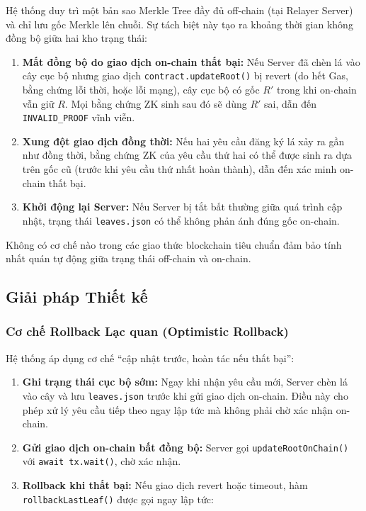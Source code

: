 \documentclass[../DoAn.tex]{subfiles}
\begin{document}
Hệ thống duy trì một bản sao Merkle Tree đầy đủ off-chain (tại Relayer Server) và chỉ lưu gốc Merkle lên chuỗi. Sự tách biệt này tạo ra khoảng thời gian không đồng bộ giữa hai kho trạng thái:

\begin{enumerate}
    \item \textbf{Mất đồng bộ do giao dịch on-chain thất bại:} Nếu Server đã chèn lá vào cây cục bộ nhưng giao dịch \texttt{contract.updateRoot()} bị revert (do hết Gas, bằng chứng lỗi thời, hoặc lỗi mạng), cây cục bộ có gốc $R'$ trong khi on-chain vẫn giữ $R$. Mọi bằng chứng ZK sinh sau đó sẽ dùng $R'$ sai, dẫn đến \texttt{INVALID\_PROOF} vĩnh viễn.

    \item \textbf{Xung đột giao dịch đồng thời:} Nếu hai yêu cầu đăng ký lá xảy ra gần như đồng thời, bằng chứng ZK của yêu cầu thứ hai có thể được sinh ra dựa trên gốc cũ (trước khi yêu cầu thứ nhất hoàn thành), dẫn đến xác minh on-chain thất bại.

    \item \textbf{Khởi động lại Server:} Nếu Server bị tắt bất thường giữa quá trình cập nhật, trạng thái \texttt{leaves.json} có thể không phản ánh đúng gốc on-chain.
\end{enumerate}

Không có cơ chế nào trong các giao thức blockchain tiêu chuẩn đảm bảo tính nhất quán tự động giữa trạng thái off-chain và on-chain.

\subsection{Giải pháp Thiết kế}
\label{subsec:sync_solution}

\subsubsection{Cơ chế Rollback Lạc quan (Optimistic Rollback)}

Hệ thống áp dụng cơ chế ``cập nhật trước, hoàn tác nếu thất bại'':

\begin{enumerate}
    \item \textbf{Ghi trạng thái cục bộ sớm:} Ngay khi nhận yêu cầu mới, Server chèn lá vào cây và lưu \texttt{leaves.json} trước khi gửi giao dịch on-chain. Điều này cho phép xử lý yêu cầu tiếp theo ngay lập tức mà không phải chờ xác nhận on-chain.

    \item \textbf{Gửi giao dịch on-chain bất đồng bộ:} Server gọi \texttt{updateRootOnChain()} với \texttt{await tx.wait()}, chờ xác nhận.

    \item \textbf{Rollback khi thất bại:} Nếu giao dịch revert hoặc timeout, hàm \texttt{rollbackLastLeaf()} được gọi ngay lập tức:
\end{enumerate}
\end{document}
